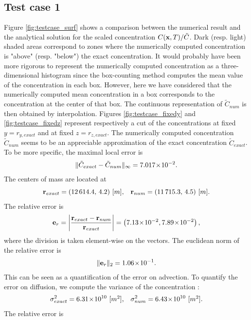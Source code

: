 \subsection{Test case 1}
Figure \ref{fig:testcase_surf} shows a comparison between the numerical result and the analytical solution for the scaled concentration $C(\mathbf x,T)/\tilde C$. Dark (resp. light) shaded areas correspond to zones where the numerically computed concentration is "above" (resp. "below") the exact concentration. It would probably have been more rigorous to represent the numerically computed concentration as a three-dimensional histogram since the box-counting method computes the mean value of the concentration in each box. However, here we have considered that the numerically computed mean concentration in a box corresponds to the concentration at the center of that box. The continuous representation of $\tilde{C}_{num}$ is then obtained by interpolation. Figures \ref{fig:testcase_fixedy} and \ref{fig:testcase_fixedz} represent respectively a cut of the concentrations at fixed $y = r_{y,exact}$ and at fixed $z = r_{z,exact}$. The numerically computed concentration $\tilde C_{num}$ seems to be an appreciable approximation of the exact concentration $\tilde C_{exact}$. To be more specific, the maximal local error is 
\begin{equation}
	\|\tilde C_{exact}- \tilde C_{num}\|_{\infty} = 7.017\!\times\!10^{-2}.
\end{equation}
The centers of mass are located at
\begin{equation}
	\mathbf r_{exact} = (12\,614.4,\,4.2) \mbox{ [$m$],}\quad \mathbf r_{num} = (11\,715.3,\,4.5) \mbox{ [$m$]}.
\end{equation}
The relative error is
\begin{equation}
	\mathbf e_r = \left \lvert \frac{\mathbf r_{exact}-\mathbf r_{num}}{\mathbf r_{exact}} \right \rvert =  \left(7.13\!\times\!10^{-2}, 7.89\!\times\!10^{-2}\right),
\end{equation}
where the division is taken element-wise on the vectors. The euclidean norm of the relative error is
\begin{equation}
	\| \mathbf e_r \|_2 = 1.06\!\times\!10^{-1}.
\end{equation}
This can be seen as a quantification of the error on advection. To quantify the error on diffusion, we compute the variance of the concentration :
\begin{equation}
	\sigma^2_{exact} = 6.31\!\times\!10^{10} \mbox{ [$m^2$],}\quad \sigma^2_{num} = 6.43\!\times\!10^{10} \mbox{ [$m^2$].}
\end{equation}
The relative error is
